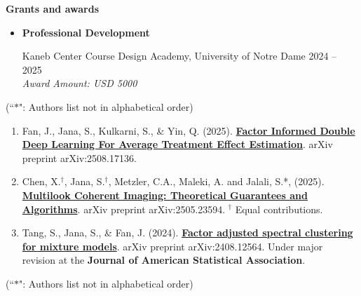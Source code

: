 \documentclass[letterpaper,12pt,oneside]{article}
\theoremstyle{definition}
\begin{document}
			\noindent \textbf{Grants and awards}
			
			\begin{itemize}
				\item[]  \textbf{Professional Development}
				
				Kaneb Center Course Design Academy, University of Notre Dame \hfill
				2024 -- 2025\\
				{\it Award Amount: USD 5000}
			\end{itemize}
			
			
			 (``$\ast$": Authors list not in alphabetical order)
			
			\begin{enumerate}
				
				\item Fan, J., Jana, S., Kulkarni, S., \& Yin, Q. (2025). \href{https://janasoham.github.io/files/fiddle.pdf}{\bf Factor Informed Double Deep Learning For Average Treatment Effect Estimation}. arXiv preprint arXiv:2508.17136.
				
				\item Chen, X.$^\dagger$, Jana, S.$^\dagger$, Metzler, C.A., Maleki, A. and Jalali, S.*, (2025). \href{https://arxiv.org/abs/2505.23594}{\bf Multilook Coherent Imaging: Theoretical Guarantees and Algorithms}. arXiv preprint arXiv:2505.23594. $^\dagger$ Equal contributions.
				
				\item Tang, S., Jana, S., \& Fan, J. (2024). \href{https://www.arxiv.org/abs/2408.12564}{\bf Factor adjusted spectral clustering for mixture models}. arXiv preprint arXiv:2408.12564. Under major revision at the {\bf Journal of American Statistical Association}.
				
				
			\end{enumerate}
			
			 (``$\ast$": Authors list not in alphabetical order)
			
\end{document}

